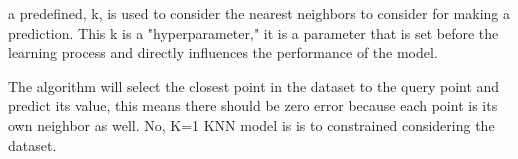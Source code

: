 \documentclass[12pt]{article}
\begin{document}

\begin{enumerate}


a predefined, k, is used to consider the nearest neighbors to consider for making a prediction. This k is a "hyperparameter," it is a parameter that is set before the learning process and directly influences the performance of the model.



The algorithm will select the closest point in the dataset to the query point and predict its value, this means there should be zero error because each point is its own neighbor as well. No, K=1 KNN model is is to constrained considering the dataset.

\end{enumerate}

\end{document}
